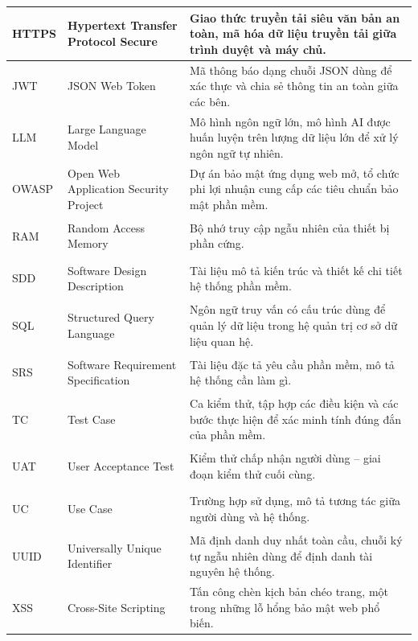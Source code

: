 \begin{longtable}{|>{\bfseries\raggedright\arraybackslash}p{1.5cm}|>{\raggedright\arraybackslash}p{5.0cm}|>{\raggedright\arraybackslash}p{7.5cm}|}
  HTTPS & Hypertext Transfer Protocol Secure &
         Giao thức truyền tải siêu văn bản an toàn, mã hóa dữ liệu truyền tải giữa trình duyệt và máy chủ. \\ \hline
  JWT   & JSON Web Token &
         Mã thông báo dạng chuỗi JSON dùng để xác thực và chia sẻ thông tin an toàn giữa các bên. \\ \hline
  LLM   & Large Language Model &
         Mô hình ngôn ngữ lớn, mô hình AI được huấn luyện trên lượng dữ liệu lớn để xử lý ngôn ngữ tự nhiên. \\ \hline
  OWASP & Open Web Application Security Project &
         Dự án bảo mật ứng dụng web mở, tổ chức phi lợi nhuận cung cấp các tiêu chuẩn bảo mật phần mềm. \\ \hline

  RAM   & Random Access Memory &
         Bộ nhớ truy cập ngẫu nhiên của thiết bị phần cứng. \\ \hline
  SDD   & Software Design Description &
         Tài liệu mô tả kiến trúc và thiết kế chi tiết hệ thống phần mềm. \\ \hline

  SQL   & Structured Query Language &
         Ngôn ngữ truy vấn có cấu trúc dùng để quản lý dữ liệu trong hệ quản trị cơ sở dữ liệu quan hệ. \\ \hline
  SRS   & Software Requirement Specification &
         Tài liệu đặc tả yêu cầu phần mềm, mô tả hệ thống cần làm gì. \\ \hline
  TC    & Test Case &
         Ca kiểm thử, tập hợp các điều kiện và các bước thực hiện để xác minh tính đúng đắn của phần mềm. \\ \hline
  UAT   & User Acceptance Test &
         Kiểm thử chấp nhận người dùng -- giai đoạn kiểm thử cuối cùng. \\ \hline
  UC    & Use Case &
         Trường hợp sử dụng, mô tả tương tác giữa người dùng và hệ thống. \\ \hline
  UUID  & Universally Unique Identifier &
         Mã định danh duy nhất toàn cầu, chuỗi ký tự ngẫu nhiên dùng để định danh tài nguyên hệ thống. \\ \hline
  XSS   & Cross-Site Scripting &
         Tấn công chèn kịch bản chéo trang, một trong những lỗ hổng bảo mật web phổ biến. \\ \hline
\end{longtable}